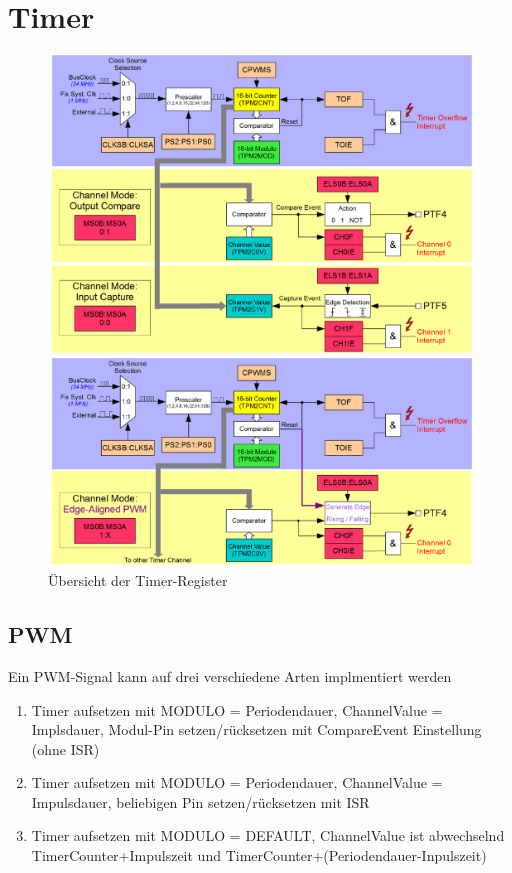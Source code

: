 \newpage
\section{Timer}

\begin{figure}[h!]
	\centering
	\includegraphics[width=1\textwidth]{../fig/timer.pdf}

	\includegraphics[width=1\textwidth]{../fig/pwm.pdf}
	\caption{Übersicht der Timer-Register}
\end{figure}

\subsection{PWM}
Ein PWM-Signal kann auf drei verschiedene Arten implmentiert werden
\begin{enumerate}
	\item Timer aufsetzen mit MODULO = Periodendauer, 
		ChannelValue = Implsdauer, Modul-Pin setzen/rücksetzen mit
		CompareEvent Einstellung (ohne ISR)
	\item Timer aufsetzen mit MODULO = Periodendauer,
		ChannelValue = Impulsdauer, beliebigen Pin setzen/rücksetzen
		mit ISR
	\item Timer aufsetzen mit MODULO = DEFAULT, ChannelValue ist
		abwechselnd TimerCounter+Impulszeit und
		TimerCounter+(Periodendauer-Inpulszeit)
\end{enumerate}

